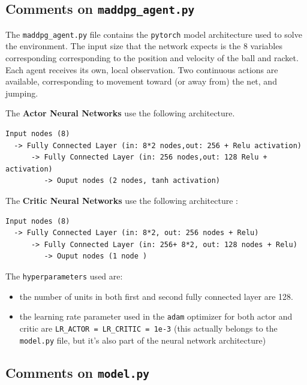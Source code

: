 \documentclass[
]{article}
\providecommand{\tightlist}{%
  \setlength{\itemsep}{0pt}\setlength{\parskip}{0pt}}
\begin{document}
\hypertarget{comments-on-maddpg_agent.py}{%
\subsection{\texorpdfstring{Comments on
\texttt{maddpg\_agent.py}}{Comments on maddpg\_agent.py}}\label{comments-on-maddpg_agent.py}}

The \texttt{maddpg\_agent.py} file contains the \texttt{pytorch} model
architecture used to solve the environment. The input size that the
network expects is the 8 variables corresponding corresponding to the
position and velocity of the ball and racket. Each agent receives its
own, local observation. Two continuous actions are available,
corresponding to movement toward (or away from) the net, and jumping.

The \textbf{Actor Neural Networks} use the following architecture.

\begin{verbatim}
Input nodes (8) 
  -> Fully Connected Layer (in: 8*2 nodes,out: 256 + Relu activation) 
      -> Fully Connected Layer (in: 256 nodes,out: 128 Relu + activation) 
         -> Ouput nodes (2 nodes, tanh activation)
\end{verbatim}

The \textbf{Critic Neural Networks} use the following architecture :

\begin{verbatim}
Input nodes (8) 
  -> Fully Connected Layer (in: 8*2, out: 256 nodes + Relu) 
      -> Fully Connected Layer (in: 256+ 8*2, out: 128 nodes + Relu) 
         -> Ouput nodes (1 node )
\end{verbatim}

The \texttt{hyperparameters} used are:

\begin{itemize}
\tightlist
\item
  the number of units in both first and second fully connected layer are
  128.
\item
  the learning rate parameter used in the \texttt{adam} optimizer for
  both actor and critic are \texttt{LR\_ACTOR\ =\ LR\_CRITIC\ =\ 1e-3}
  (this actually belongs to the \texttt{model.py} file, but it's also
  part of the neural network architecture)
\end{itemize}

\hypertarget{comments-on-model.py}{%
\subsection{\texorpdfstring{Comments on
\texttt{model.py}}{Comments on model.py}}\label{comments-on-model.py}}
\end{document}
